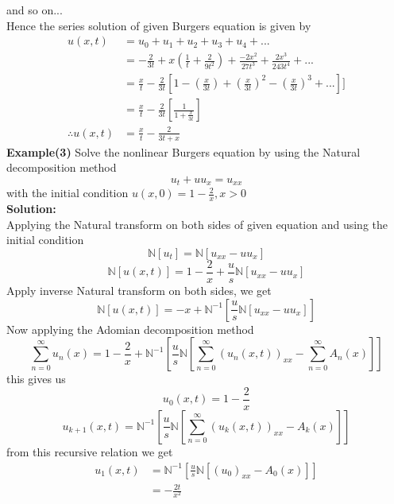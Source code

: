 and so on...\\
Hence the series solution of given Burgers equation is given by
\begin{align*}
u(x,t)&= u_{0}+u_{1}+u_{2}+u_{3}+u_{4}+...\\
&= -\frac{2}{3t}+x(\frac{1}{t}+\frac{2}{9t^2})+\frac{-2x^2}{27t^3}+\frac{2x^3}{243t^4}+...\\
&=\frac{x}{t}-\frac{2}{3t}[1-(\frac{x}{3t})+(\frac{x}{3t})^2-(\frac{x}{3t})^3+...]]\\
&=\frac{x}{t}-\frac{2}{3t}[\frac{1}{1+\frac{x}{3t}}]\\
\therefore u(x,t)&=\frac{x}{t}-\frac{2}{3t+x}
\end{align*}
\textbf{Example(3)} Solve the nonlinear Burgers equation by using the Natural decomposition method
\begin{equation*}
  u_{t}+uu_{x}=u_{xx}
 \end{equation*}
with the initial condition $u(x,0)=1-\frac{2}{x}, x>0 $\\
\textbf{Solution:} \\
Applying the Natural transform on both sides of given equation and using the initial condition
\begin{equation*}
\mathbb{N}[u_{t}]=\mathbb{N}[u_{xx}-uu_{x}]
\end{equation*}
\begin{equation*}
\mathbb{N}[u(x,t)]=1-\frac{2}{x}+\frac{u}{s}\mathbb{N}[u_{xx}-uu_{x}]
\end{equation*}
Apply inverse Natural transform on both sides, we get
\begin{equation*}
\mathbb{N}[u(x,t)]=-x+\mathbb{N}^{-1}[\frac{u}{s}\mathbb{N}[u_{xx}-uu_{x}]]
\end{equation*}
Now applying the Adomian decomposition method
\begin{equation}
\sum_{n=0}^{\infty} u_{n}(x)=1-\frac{2}{x}+\mathbb{N}^{-1}[\frac{u}{s}\mathbb{N}[\sum_{n=0}^{\infty} (u_{n}(x,t))_{xx}-\sum_{n=0}^{\infty} A_{n}(x)]]
\end{equation}
this gives us
\begin{equation*}
u_{0}(x,t)=1-\frac{2}{x}
\end{equation*}
\begin{equation*}
u_{k+1}(x,t) = \mathbb{N}^{-1}[\frac{u}{s}\mathbb{N}[\sum_{n=0}^{\infty} (u_{k}(x,t))_{xx}- A_{k}(x)]]
\end{equation*}
from this recursive relation we get
\begin{align*}
u_{1}(x,t)&=\mathbb{N}^{-1}[\frac{u}{s}\mathbb{N}[(u_{0})_{xx}- A_{0}(x)]]\\
&=-\frac{2t}{x^2}
\end{align*}
